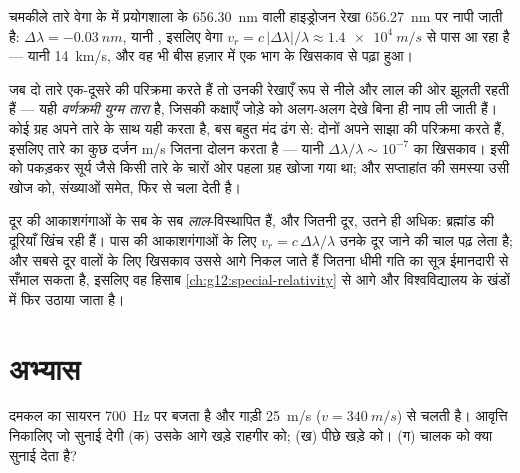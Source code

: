 \begin{example}[तारे का भागना तौलना]\label{ex:g12:doppler-effect:vega}
चमकीले तारे वेगा के  में प्रयोगशाला के 
\qty{656.30}{nm} वाली हाइड्रोजन रेखा \qty{656.27}{nm} पर नापी जाती है: $\Delta\lambda = \qty{-0.03}{nm}$, यानी
, इसलिए वेगा $v_r = c\,|\Delta\lambda|/\lambda \approx \qty{1.4e4}{m/s}$ से पास आ रहा है --- यानी \qty{14}{km/s},
और वह भी बीस हज़ार में एक भाग के खिसकाव से पढ़ा हुआ।
\end{example}

\begin{example}[डगमगाते तारे: युग्म तारे और बहिर्ग्रह]\label{ex:g12:doppler-effect:wobble}
जब दो तारे एक-दूसरे की परिक्रमा करते हैं तो उनकी रेखाएँ
 रूप से नीले और लाल की ओर झूलती रहती हैं --- यही
\emph{वर्णक्रमी युग्म तारा} है, जिसकी
कक्षाएँ जोड़े को अलग-अलग देखे बिना ही नाप ली जाती हैं। कोई ग्रह अपने
तारे के साथ यही करता है, बस बहुत मंद ढंग से: दोनों अपने साझा
 की परिक्रमा करते हैं, इसलिए तारे का  कुछ दर्जन \unit{m/s} जितना दोलन करता है --- यानी $\Delta\lambda/\lambda \sim 10^{-7}$ का खिसकाव। इसी को
पकड़कर सूर्य जैसे किसी तारे के चारों ओर पहला ग्रह खोजा गया था; और सप्ताहांत की
समस्या उसी खोज को, संख्याओं समेत, फिर से चला देती है।
\end{example}

\begin{remark}[आकाशगंगाओं का लाल विस्थापन]\label{rem:g12:doppler-effect:expansion}
दूर की आकाशगंगाओं के  सब के सब \emph{लाल}-विस्थापित हैं, और जितनी दूर,
उतने ही अधिक: ब्रह्मांड की दूरियाँ खिंच रही हैं। पास की आकाशगंगाओं के लिए
$v_r = c\,\Delta\lambda/\lambda$ उनके दूर जाने की चाल पढ़ लेता है; और सबसे दूर वालों के लिए खिसकाव उससे
आगे निकल जाते हैं जितना धीमी गति का सूत्र ईमानदारी से सँभाल सकता है, इसलिए वह
हिसाब \cref{ch:g12:special-relativity} से आगे और विश्वविद्यालय के खंडों में फिर उठाया जाता है।
\end{remark}

\section{अभ्यास}

\begin{exercise}[$\star$]\label{exo:g12:doppler-effect:1}
दमकल का सायरन \qty{700}{Hz} पर बजता है और गाड़ी \qty{25}{m/s} ($v = \qty{340}{m/s}$) से चलती है।
आवृत्ति निकालिए जो सुनाई देगी (क) उसके आगे खड़े राहगीर को; (ख) पीछे
खड़े को। (ग) चालक को क्या सुनाई देता है?
\end{exercise}


